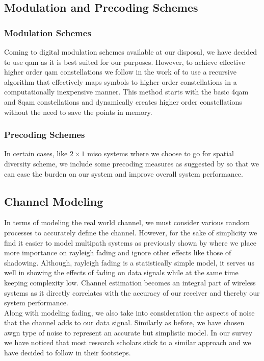 \subsection{Modulation and Precoding Schemes}

\subsubsection{Modulation Schemes}
Coming to digital modulation schemes available at our disposal, we have decided to use \acrshort{qam} as it is best suited for our purposes. However, to achieve effective higher order \acrshort{qam} constellations we follow in the work of \textcite{Bellili} to use a recursive algorithm that effectively maps symbols to higher order constellations in a computationally inexpensive manner. This method starts with the basic 4\acrshort{qam} and 8\acrshort{qam} constellations and dynamically creates higher order constellations without the need to save the points in memory.

\subsubsection{Precoding Schemes}
In certain cases, like $2 \times 1$ \acrshort{miso} systems where we choose to go for \gls{spatial diversity} scheme, we include some precoding measures as suggested by \textcite{Alamouti} so that we can ease the burden on our system and improve overall system performance.

\subsection{Channel Modeling}
In terms of modeling the real world channel, we must consider various random processes to accurately define the channel. However, for the sake of simplicity we find it easier to model multipath systems as previously shown by \textcite{Hanlen and Fu} where we place more importance on \gls{rayleigh fading} and ignore other effects like those of shadowing. Although, \gls{rayleigh fading} is a statistically simple model, it serves us well in showing the effects of fading on data signals while at the same time keeping complexity low. Channel estimation becomes an integral part of wireless systems as it directly correlates with the accuracy of our receiver and thereby our system performance.\\
Along with modeling fading, we also take into consideration the aspects of noise that the channel adds to our data signal. Similarly as before, we have chosen \acrshort{awgn} type of noise to represent an accurate but simplistic model. In our survey we have noticed that most research scholars stick to a similar approach and we have decided to follow in their footsteps.


